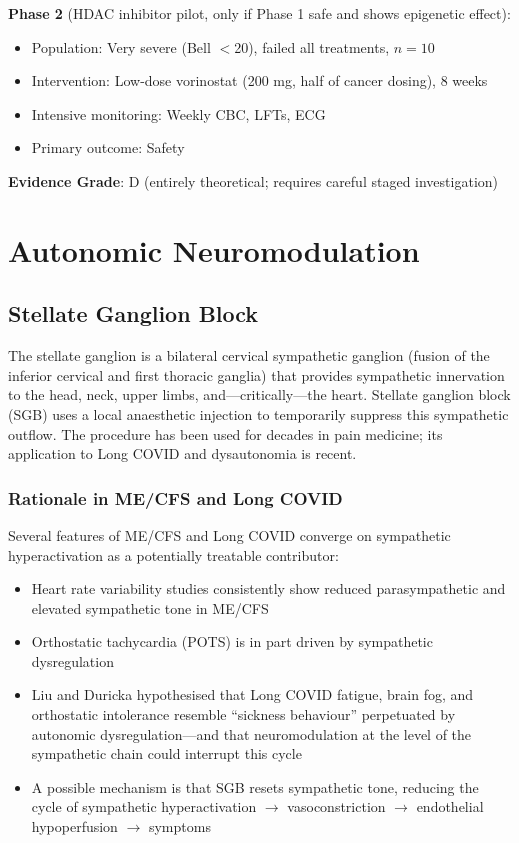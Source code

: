 \textbf{Phase 2} (HDAC inhibitor pilot, only if Phase 1 safe and shows epigenetic effect):
\begin{itemize}
    \item Population: Very severe (Bell $<$20), failed all treatments, $n = 10$
    \item Intervention: Low-dose vorinostat (200 mg, half of cancer dosing), 8 weeks
    \item Intensive monitoring: Weekly CBC, LFTs, ECG
    \item Primary outcome: Safety
\end{itemize}

\textbf{Evidence Grade}: D (entirely theoretical; requires careful staged investigation)


\section{Autonomic Neuromodulation}
\label{sec:autonomic-neuromodulation}

\subsection{Stellate Ganglion Block}
\label{subsec:stellate-ganglion-block}

The stellate ganglion is a bilateral cervical sympathetic ganglion (fusion of the inferior cervical and first thoracic ganglia) that provides sympathetic innervation to the head, neck, upper limbs, and---critically---the heart. Stellate ganglion block (SGB) uses a local anaesthetic injection to temporarily suppress this sympathetic outflow. The procedure has been used for decades in pain medicine; its application to Long COVID and dysautonomia is recent.

\subsubsection{Rationale in ME/CFS and Long COVID}

Several features of ME/CFS and Long COVID converge on sympathetic hyperactivation as a potentially treatable contributor:
\begin{itemize}
    \item Heart rate variability studies consistently show reduced parasympathetic and elevated sympathetic tone in ME/CFS
    \item Orthostatic tachycardia (POTS) is in part driven by sympathetic dysregulation
    \item Liu and Duricka hypothesised that Long COVID fatigue, brain fog, and orthostatic intolerance resemble ``sickness behaviour'' perpetuated by autonomic dysregulation---and that neuromodulation at the level of the sympathetic chain could interrupt this cycle~\cite{Liu2022SGB}
    \item A possible mechanism is that SGB resets sympathetic tone, reducing the cycle of sympathetic hyperactivation $\to$ vasoconstriction $\to$ endothelial hypoperfusion $\to$ symptoms
\end{itemize}

